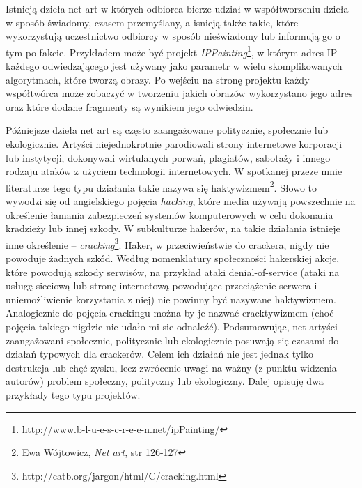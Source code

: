 \documentclass[a4paper,12pt,twoside]{article}
\begin{document}
Istnieją dzieła net art w których odbiorca bierze udział w współtworzeniu
dzieła w sposób świadomy, czasem przemyślany, a isnieją także takie,
które wykorzystują uczestnictwo odbiorcy w sposób nieświadomy lub informują
go o tym po fakcie. Przykładem może być projekt
\textit{IPPainting}\footnote{http://www.b-l-u-e-s-c-r-e-e-n.net/ipPainting/},
w którym adres IP każdego odwiedzającego jest używany jako parametr w wielu
skomplikowanych algorytmach, które tworzą obrazy. Po wejściu na stronę
projektu każdy współtwórca może zobaczyć w tworzeniu jakich obrazów
wykorzystano jego adres oraz które dodane fragmenty są wynikiem jego odwiedzin.

Późniejsze dzieła net art są często zaangażowane politycznie, społecznie
lub ekologicznie. Artyści niejednokrotnie parodiowali strony internetowe
korporacji lub instytycji, dokonywali wirtulanych porwań, plagiatów,
sabotaży i innego rodzaju ataków z użyciem technologii internetowych.
W spotkanej przeze mnie literaturze tego typu działania takie nazywa się
haktywizmem\footnote{Ewa Wójtowicz, \textit{Net art}, str 126-127}.
Słowo to wywodzi się od angielskiego pojęcia \textit{hacking},
które media używają powszechnie na określenie łamania zabezpieczeń
systemów komputerowych w celu dokonania kradzieży lub innej szkody.
W subkulturze hakerów, na takie działania istnieje inne określenie --
\textit{cracking}\footnote{http://catb.org/jargon/html/C/cracking.html}.
Haker, w przeciwieństwie do crackera, nigdy nie
powoduje żadnych szkód. Według nomenklatury społeczności hakerskiej
akcje, które powodują szkody serwisów, na przykład ataki denial-of-service
(ataki na usługę sieciową lub stronę internetową powodujące przeciążenie
serwera i uniemożliwienie korzystania z niej) nie powinny być nazywane
haktywizmem. Analogicznie do pojęcia crackingu można by je nazwać
cracktywizmem (choć pojęcia takiego nigdzie nie udało mi sie odnaleźć).
Podsumowując, net artyści zaangażowani społecznie, politycznie lub
ekologicznie posuwają się czasami do działań typowych dla crackerów.
Celem ich działań nie jest jednak tylko destrukcja lub chęć zysku,
lecz zwrócenie uwagi na ważny (z punktu widzenia autorów) problem
społeczny, polityczny lub ekologiczny. Dalej opisuję dwa przykłady
tego typu projektów.
\end{document}
